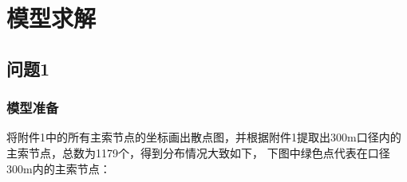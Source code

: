 \documentclass[withoutpreface,bwprint]{cumcmthesis} %
\begin{document}
        \newpage


        \section{模型求解}

        \subsection{问题1}

        \subsubsection{模型准备}
将附件1中的所有主索节点的坐标画出散点图，并根据附件1提取出300m口径内的主索节点，总数为1179个，得到分布情况大致如下，
下图中绿色点代表在口径300m内的主索节点：
\end{document}
